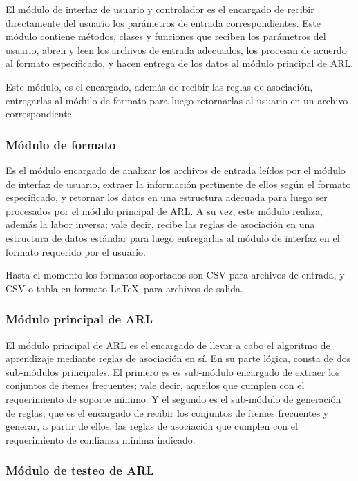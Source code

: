El módulo de interfaz de usuario y controlador es el encargado de recibir directamente del usuario los parámetros de entrada correspondientes. Este módulo contiene métodos, clases y funciones que reciben los parámetros del usuario, abren y leen los archivos de entrada adecuados, los procesan de acuerdo al formato especificado, y hacen entrega de los datos al módulo principal de ARL.

Este módulo, es el encargado, además de recibir las reglas de asociación, entregarlas al módulo de formato para luego retornarlas al usuario en un archivo correspondiente.

\subsubsection{Módulo de formato}

Es el módulo encargado de analizar los archivos de entrada leídos por el módulo de interfaz de usuario, extraer la información pertinente de ellos según el formato especificado, y retornar los datos en una estructura adecuada para luego ser procesados por el módulo principal de ARL. A su vez, este módulo realiza, además la labor inversa; vale decir, recibe las reglas de asociación en una estructura de datos estándar para luego entregarlas al módulo de interfaz en el formato requerido por el usuario.

Hasta el momento los formatos soportados son CSV para archivos de entrada, y CSV o tabla en formato \LaTeX\ para archivos de salida.

\subsubsection{Módulo principal de ARL}

El módulo principal de ARL es el encargado de llevar a cabo el algoritmo de aprendizaje mediante reglas de asociación en sí. En su parte lógica, consta de dos sub-módulos principales. El primero es es sub-módulo encargado de extraer los conjuntos de ítemes frecuentes; vale decir, aquellos que cumplen con el requerimiento de soporte mínimo. Y el segundo es el sub-módulo de generación de reglas, que es el encargado de recibir los conjuntos de ítemes frecuentes y generar, a partir de ellos, las reglas de asociación que cumplen con el requerimiento de confianza mínima indicado.

\subsubsection{Módulo de testeo de ARL}

